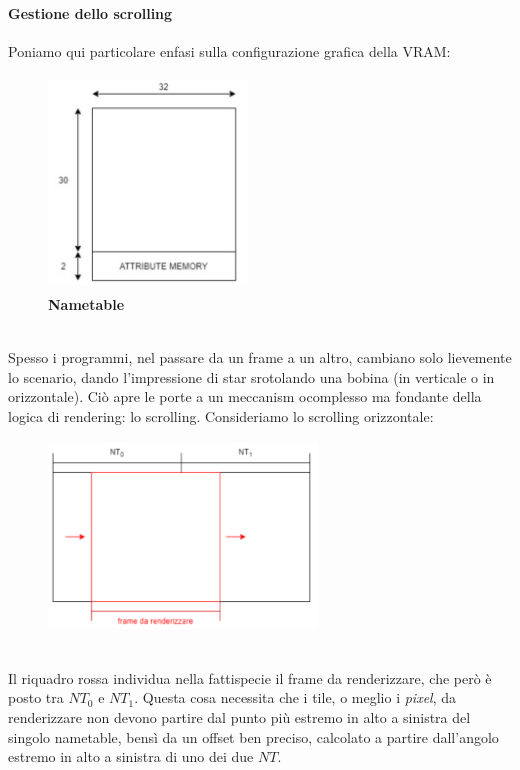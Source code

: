 \documentclass[11pt]{article}
\begin{document}
\paragraph{Gestione dello scrolling} Poniamo qui particolare enfasi sulla configurazione grafica della VRAM:
\begin{figure}[h]
\centering
\includegraphics[width=200px, height=215px]{NAMETABLE.jpg}\\
\small\textbf{Nametable}
\end{figure}\\
Spesso i programmi, nel passare da un frame a un altro, cambiano solo lievemente lo scenario, dando l'impressione di star srotolando una bobina (in verticale o in orizzontale). Ciò apre le porte a un meccanism ocomplesso ma fondante della logica di rendering: lo scrolling.
\clearpage
Consideriamo lo scrolling orizzontale:
\begin{figure}[h]
\centering
\includegraphics[width=270px, height=190px]{HOR_SCROLL.png}
\end{figure}\\
Il riquadro rossa individua nella fattispecie il frame da renderizzare, che però è posto tra $NT_0$ e $NT_1$. Questa cosa necessita che i tile, o meglio i \emph{pixel}, da renderizzare non devono partire dal punto più estremo in alto a sinistra del singolo nametable, bensì da un offset ben preciso, calcolato a partire dall'angolo estremo in alto a sinistra di uno dei due $NT$.\\
\end{document}
